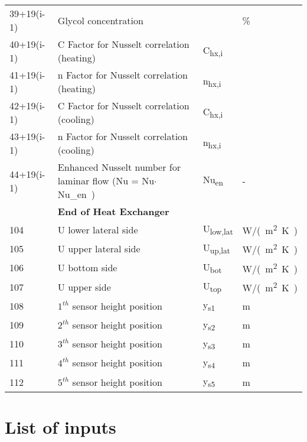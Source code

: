 \documentclass[english]{SPFReport}
\begin{document}
\begin{tabular}{| l |  m{8cm} | l | l |}
   \small{39+19(i-1)}  & Glycol concentration &  &  \%\\
    \small{40+19(i-1)}  & C Factor for  Nusselt correlation (heating)  &  \si{C_{hx,i}} & \\
    \small{41+19(i-1)}  & n Factor  for  Nusselt correlation (heating) &  \si{n_{hx,i}} & \\
     \small{42+19(i-1)}  & C Factor  for  Nusselt correlation (cooling)  &  \si{C_{hx,i}} & \\
     \small{43+19(i-1)}  & n Factor  for Nusselt correlation (cooling) &  \si{n_{hx,i}} & \\
\small{44+19(i-1)} & Enhanced Nusselt number for laminar flow (\si{Nu = Nu$\cdot$ Nu_{en}}) & \si{Nu_{en}} & - \\
      & \textbf{End of Heat Exchanger } & & \\
      \hline                                            
104 & U lower lateral side   & \si{U_{low,lat}} & \si{W/(m^2K)}\\
105 &  U upper lateral side   & \si{U_{up,lat}} &  \si{W/(m^2K)}\\
106 & U bottom side   & \si{U_{bot}} &  \si{W/(m^2K)}\\
107 & U upper side   & \si{U_{top}} &  \si{W/(m^2K)}\\
108 & $1^{th}$ sensor height position  & \si{y_{s1}} & m\\
109 & $2^{th}$ sensor height position  & \si{y_{s2}} & m\\
110 & $3^{th}$ sensor height position  & \si{y_{s3}} & m\\
111 & $4^{th}$ sensor height position  & \si{y_{s4}} & m\\
112 & $5^{th}$ sensor height position  & \si{y_{s5}} & m\\
\hline

\end{tabular}




\section{List of inputs}
\end{document}
